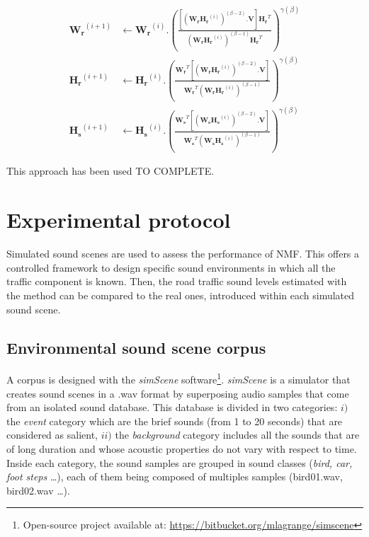 \documentclass[twocolumn,a4paper,10pt]{article}
\begin{document}
{\scriptsize
\begin{subequations}\label{eq:WH-SSupdate}
\begin{align}
\mathbf{W_r}^{(i+1)} &\leftarrow \mathbf{W_r}^{(i)}.\left(\frac{\left[\left(\mathbf{W_r H_r}^{(i)} \right)^{(\beta-2)}.\mathbf{V} \right]\mathbf{H_r}^T}{\left(\mathbf{W_r H_r}^{(i)} \right)^{(\beta-1)}\mathbf{H_r}^T}\right)^{\gamma(\beta)}\label{eq:W_r_SS}\\
\mathbf{H_r}^{(i+1)} &\leftarrow \mathbf{H_r}^{(i)}.\left(\frac{\mathbf{W_r}^T \left[\left(\mathbf{W_r H_r}^{(i)} \right)^{(\beta-2)}.\mathbf{V} \right]}{\mathbf{W_r}^T \left(\mathbf{W_r H_r}^{(i)} \right)^{(\beta-1)}}\right)^{\gamma(\beta)}\label{eq:H_r_SS}\\
\mathbf{H_s}^{(i+1)} &\leftarrow \mathbf{H_s}^{(i)}.\left(\frac{\mathbf{W_s}^T \left[\left(\mathbf{W_s H_s}^{(i)} \right)^{(\beta-2)}.\mathbf{V} \right]}{\mathbf{W_s}^T \left(\mathbf{W_s H_s}^{(i)} \right)^{(\beta-1)}}\right)^{\gamma(\beta)}\label{eq:H_s_SS}
\end{align}
\end{subequations}}

This approach has been used TO COMPLETE.

\section{Experimental protocol}\label{part:protocol}

Simulated sound scenes are used to assess the performance of NMF. This offers a controlled framework to design specific sound environments in which all the traffic component is known. Then, the road traffic sound levels estimated with the method can be compared to the real ones, introduced within each simulated sound scene.

\subsection{Environmental sound scene corpus}

A corpus is designed with the \textit{simScene} software\footnote{Open-source project available at: \url{https://bitbucket.org/mlagrange/simscene}}. \textit{simScene} \cite{rossignol_simscene:_2015} is a simulator that creates sound scenes in a .wav format by superposing audio samples that come from an isolated sound database. This database is divided in two categories: $i)$ the \textit{event} category which are the brief sounds (from 1 to 20 seconds) that are considered as salient, $ii)$ the \textit{background} category includes all the sounds that are of long duration and whose acoustic properties do not vary with respect to time. Inside each category, the sound samples are grouped in sound classes (\textit{bird, car, foot steps} \dots), each of them being composed of multiples samples (bird01.wav, bird02.wav \dots).
\end{document}
